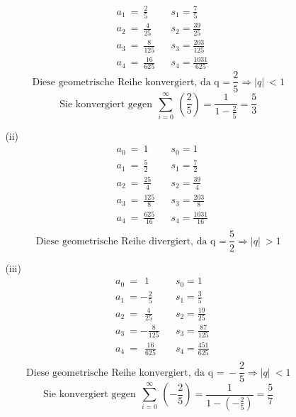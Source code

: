\documentclass [a4paper,12pt]{article}
\begin{document}
\begin{enumerate}
\begin{enumerate}
\begin{enumerate}
\begin{align*}
                                &a_1 \ = \ \frac{2}{5} 		&&	s_1 = \frac{7}{5}\\[0,15cm]
                                &a_2 \ = \ \frac{4}{25} 	&&	s_2 = \frac{39}{25}\\[0,15cm]
                                &a_3 \ = \ \frac{8}{125} 	&&	s_3 = \frac{203}{125}\\[0,15cm]
                                &a_4 \ = \ \frac{16}{625}	&&	s_4 = \frac{1031}{625} 
                            \end{align*}
				 $$\text{Diese geometrische Reihe konvergiert, da q =} \ \frac{2}{5} \Rightarrow |q| \ < 1$$
				\[\text{Sie konvergiert gegen} \ \  \sum_{i=0}^\infty~\left(\frac{2}{5}\right) = \frac{1}{1-\frac{2}{5}} = \frac{5}{3} \]
                        \item[(ii)]
                            \begin{align*}
				&a_0 \ = \ 1				&&	s_0 = 1\\[0,15cm]
				&a_1 \ = \ \frac{5}{2}		&&	s_1 = \frac{7}{2}\\[0,15cm]
				&a_2 \ = \ \frac{25}{4}		&&	s_2 = \frac{39}{4}\\[0,15cm]
				&a_3 \ = \ \frac{125}{8}	&&	s_3 = \frac{203}{8}\\[0,15cm]
				&a_4 \ = \ \frac{625}{16}	&&	s_4 = \frac{1031}{16} \\[0,15cm]
                            \end{align*}
				$$\text{Diese geometrische Reihe divergiert, da q =} \ \frac{5}{2} \Rightarrow |q| \ > 1$$
                        \item[(iii)]
                            \begin{align*}
		                &a_0 \ = \ \  1			&&      s_0 = 1\\[0,15cm]
		                &a_1 \ =  -\frac{2}{5}		&&	s_1 = \frac{3}{5}\\[0,15cm]
		                &a_2 \ = \ \  \frac{4}{25} 	&&     	s_2 = \frac{19}{25}\\[0,15cm]
		                &a_3 \ =  -\frac{8}{125}	&&      s_3 = \frac{87}{125}\\[0,15cm]
		                &a_4 \ = \ \  \frac{16}{625}	&&      s_4 = \frac{451}{625} \\
                            \end{align*}
				$$\text{Diese geometrische Reihe konvergiert, da q =} \ -\frac{2}{5} \Rightarrow |q| \ < 1 $$ 
				\[\text{Sie konvergiert gegen} \ \  \sum_{i=0}^\infty~\left(-\frac{2}{5}\right) = \frac{1}{1-(-\frac{2}{5})} = \frac{5}{7} \]

\end{enumerate}
\end{enumerate}
\end{enumerate}
\end{document}
